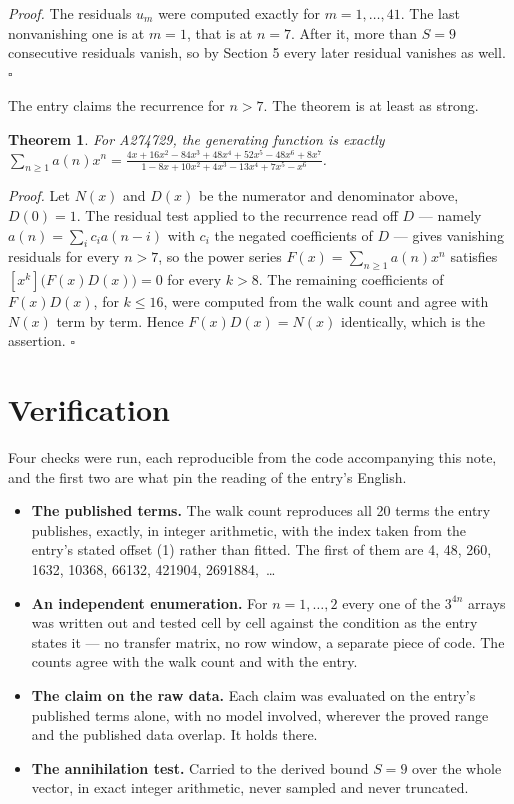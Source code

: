 \documentclass[11pt]{article}
\newtheorem{theorem}{Theorem}
\theoremstyle{definition}
\begin{document}
{\itshape Proof.} The residuals $u_m$ were computed exactly for $m = 1,\dots,41$. The last nonvanishing one is at $m = 1$, that is at $n = 7$. After it, more than $S = 9$ consecutive residuals vanish, so by Section 5 every later residual vanishes as well. $\square$

The entry claims the recurrence for $n > 7$. The theorem is at least as strong.

\begin{theorem} For A274729, the generating function is exactly $\sum_{n\ge 1} a(n)x^n = \frac{4x + 16x^{2} - 84x^{3} + 48x^{4} + 52x^{5} - 48x^{6} + 8x^{7}}{1 - 8x + 10x^{2} + 4x^{3} - 13x^{4} + 7x^{5} - x^{6}}$.\end{theorem}

{\itshape Proof.} Let $N(x)$ and $D(x)$ be the numerator and denominator above, $D(0)=1$. The residual test applied to the recurrence read off $D$ --- namely $a(n) = \sum_i c_i a(n-i)$ with $c_i$ the negated coefficients of $D$ --- gives vanishing residuals for every $n > 7$, so the power series $F(x)=\sum_{n\ge 1}a(n)x^n$ satisfies $[x^k]\bigl(F(x)D(x)\bigr) = 0$ for every $k > 8$. The remaining coefficients of $F(x)D(x)$, for $k \le 16$, were computed from the walk count and agree with $N(x)$ term by term. Hence $F(x)D(x) = N(x)$ identically, which is the assertion. $\square$

\section{Verification}

Four checks were run, each reproducible from the code accompanying this note, and the first two are what pin the reading of the entry's English.

\begin{itemize}

\item {\bfseries The published terms.} The walk count reproduces all 20 terms the entry publishes, exactly, in integer arithmetic, with the index taken from the entry's stated offset (1) rather than fitted. The first of them are 4, 48, 260, 1632, 10368, 66132, 421904, 2691884,~\dots

\item {\bfseries An independent enumeration.} For $n = 1,\dots,2$ every one of the $3^{4n}$ arrays was written out and tested cell by cell against the condition as the entry states it --- no transfer matrix, no row window, a separate piece of code. The counts agree with the walk count and with the entry.

\item {\bfseries The claim on the raw data.} Each claim was evaluated on the entry's published terms alone, with no model involved, wherever the proved range and the published data overlap. It holds there.

\item {\bfseries The annihilation test.} Carried to the derived bound $S = 9$ over the whole vector, in exact integer arithmetic, never sampled and never truncated.

\end{itemize}
\end{document}
